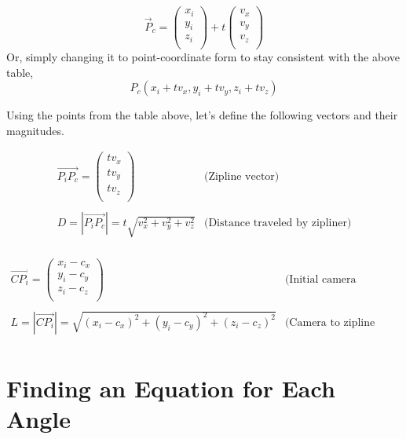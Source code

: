 \documentclass[12pt]{article}
\begin{document}
$$\vec P_c = \begin{pmatrix} x_i \\ y_i \\ z_i \\ \end{pmatrix} + t\begin{pmatrix} v_x \\ v_y \\ v_z \\ \end{pmatrix}$$
Or, simply changing it to point-coordinate form to stay consistent with the above table, 
$$P_c(x_i+tv_x, y_i+tv_y, z_i+tv_z)$$


Using the points from the table above, let's define the following vectors and their magnitudes.

$$
\begin{array}{c|c}
     \overrightarrow{P_iP_c} = \begin{pmatrix} tv_x \\ tv_y \\ tv_z \\ \end{pmatrix} & \text{(Zipline vector)} \\ \\
     D = \left\lvert \overrightarrow{P_iP_c} \right\rvert = t \sqrt{v_x^2 + v_y^2 + v_z^2} & \text{(Distance traveled by zipliner)} \\ 
     
\end{array}
$$

$$
\begin{array}{c|c}
     \overrightarrow{CP_i} = \begin{pmatrix} x_i - c_x \\ y_i - c_y \\ z_i - c_z \\ \end{pmatrix} & \text{(Initial camera orientation vector)} \\ \\
     L = \left\lvert \overrightarrow{CP_i} \right\rvert = \sqrt{(x_i-c_x)^2 + (y_i-c_y)^2 + (z_i-c_z)^2} & \text{(Camera to zipline start distance)} \\
     
\end{array}
$$

\section{Finding an Equation for Each Angle}
\end{document}
